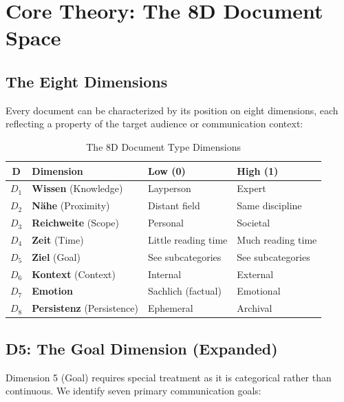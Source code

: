\section{Core Theory: The 8D Document Space}
\label{sec:doctype-theory}

\subsection{The Eight Dimensions}

Every document can be characterized by its position on eight dimensions,
each reflecting a property of the target audience or communication context:

\begin{table}[htbp]
\centering
\caption{The 8D Document Type Dimensions}
\label{tab:8d-dimensions}
\renewcommand{\arraystretch}{1.4}
\begin{tabular}{@{}clll@{}}
\toprule
\textbf{D} & \textbf{Dimension} & \textbf{Low (0)} & \textbf{High (1)} \\
\midrule
$D_1$ & \textbf{Wissen} (Knowledge) & Layperson & Expert \\
$D_2$ & \textbf{N\"ahe} (Proximity) & Distant field & Same discipline \\
$D_3$ & \textbf{Reichweite} (Scope) & Personal & Societal \\
$D_4$ & \textbf{Zeit} (Time) & Little reading time & Much reading time \\
$D_5$ & \textbf{Ziel} (Goal) & See subcategories & See subcategories \\
$D_6$ & \textbf{Kontext} (Context) & Internal & External \\
$D_7$ & \textbf{Emotion} & Sachlich (factual) & Emotional \\
$D_8$ & \textbf{Persistenz} (Persistence) & Ephemeral & Archival \\
\bottomrule
\end{tabular}
\end{table}

\subsection{D5: The Goal Dimension (Expanded)}

Dimension 5 (Goal) requires special treatment as it is categorical rather than
continuous. We identify seven primary communication goals:

